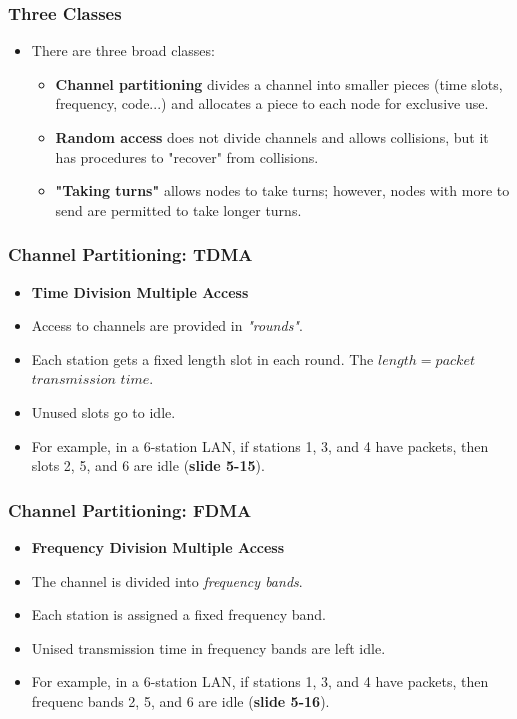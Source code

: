 \documentclass{article}
\begin{document}
\subsubsection{Three Classes}
\begin{itemize}
\item There are three broad classes:
\begin{itemize}
\item {\bf Channel partitioning} divides a channel into smaller pieces (time slots, frequency, code...) and allocates a piece to each node for exclusive use.
\item {\bf Random access} does not divide channels and allows collisions, but it has procedures to "recover" from collisions.
\item {\bf "Taking turns"} allows nodes to take turns; however, nodes with more to send are permitted to take longer turns.
\end{itemize}
\end{itemize}

\subsubsection{Channel Partitioning: TDMA}
\begin{itemize}
\item {\bf Time Division Multiple Access}
\item Access to channels are provided in \emph{"rounds"}.
\item Each station gets a fixed length slot in each round. The $length = packet$ $transmission$ $time$.
\item Unused slots go to idle.
\item For example, in a 6-station LAN, if stations 1, 3, and 4 have packets, then slots 2, 5, and 6 are idle ({\bf slide 5-15}).
\end{itemize}

\clearpage

\subsubsection{Channel Partitioning: FDMA}
\begin{itemize}
\item {\bf Frequency Division Multiple Access}
\item The channel is divided into \emph{frequency bands}.
\item Each station is assigned a fixed frequency band.
\item Unised transmission time in frequency bands are left idle.
\item For example, in a 6-station LAN, if stations 1, 3, and 4 have packets, then frequenc bands 2, 5, and 6 are idle ({\bf slide 5-16}).
\end{itemize}
\end{document}
